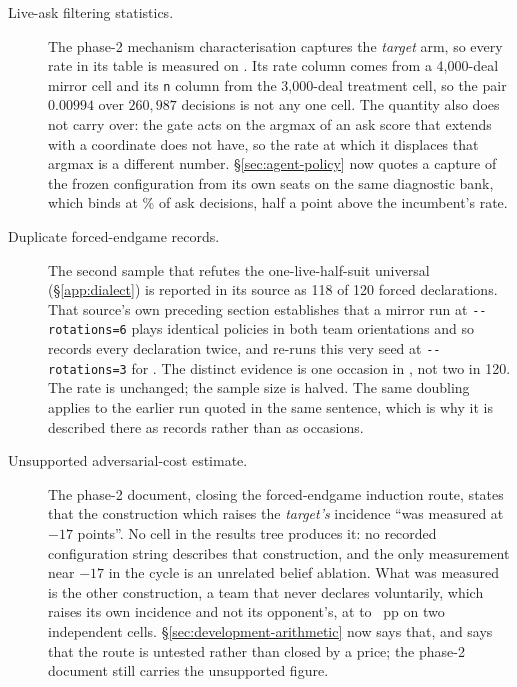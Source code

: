 \begin{description}
\item[Live-ask filtering statistics.] The
  phase-2 mechanism characterisation captures the \emph{target} arm, so every rate in its table is
  measured on \vsix{}. Its rate column comes from a 4,000-deal mirror cell and its
  \texttt{n} column from the 3,000-deal treatment cell, so the pair
  $0.00994$ over $260{,}987$ decisions is not any one cell. The quantity also does not carry over:
  the gate acts on the argmax of an ask score that \sestina{} extends with a coordinate
  \vsix{} does not have, so the rate at which it displaces that argmax is a different number.
  \S\ref{sec:agent-policy} now quotes a capture of the frozen configuration from its own seats on the
  same diagnostic bank, which binds at \vsevenGateBindRate\% of \vsevenGateBindN{} ask decisions,
  half a point above the incumbent's rate.

\item[Duplicate forced-endgame records.] The second sample that refutes the
  one-live-half-suit universal (\S\ref{app:dialect}) is reported in its source as 118 of 120 forced
  declarations. That source's own preceding section establishes that a mirror run at
  \texttt{-{}-rotations=6} plays identical policies in both team orientations and so records every
  declaration twice, and re-runs this very seed at \texttt{-{}-rotations=3} for
  \vsevenLadderSecondTotal{}. The distinct evidence is one occasion in \vsevenLadderSecondTotal{},
  not two in 120. The rate is unchanged; the sample size is halved. The same doubling applies to the
  earlier run quoted in the same sentence, which is why it is described there as records rather than
  as occasions.

\item[Unsupported adversarial-cost estimate.] The phase-2 document, closing the
  forced-endgame induction route, states that the construction which raises the \emph{target's}
  incidence ``was measured at $-17$ points''. No cell in the results tree produces it: no recorded
  configuration string describes that construction, and the only measurement near $-17$ in the cycle
  is an unrelated belief ablation. What was measured is the other construction, a team that never
  declares voluntarily, which raises its own incidence and not its opponent's, at
  \vsevenLthirteenAdvCostLo{} to \vsevenLthirteenAdvCostHi{}~pp on two independent cells.
  \S\ref{sec:development-arithmetic} now says that, and says that the route is untested rather
  than closed by a price; the phase-2 document still carries the unsupported figure.


\end{description}
